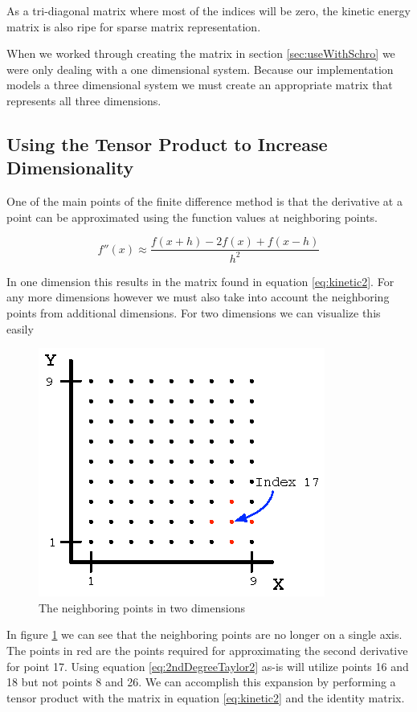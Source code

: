 \documentclass[authoryearcitations]{UoYCSproject}
\begin{document}
As a tri-diagonal matrix where most of the indices will be zero, the kinetic energy matrix is also ripe for sparse
matrix representation. 

When we worked through creating the matrix in section \ref{sec:useWithSchro} we were only dealing with a one dimensional
system. Because our implementation models a three dimensional system we must create an appropriate matrix that represents
all three dimensions. 


\subsection{Using the Tensor Product to Increase Dimensionality}
\label{sec:tensor}
One of the main points of the finite difference method is that the derivative at a point can be approximated
using the function values at neighboring points.

\begin{equation}
f''(x) \approx \frac{f(x + h) - 2f(x) + f(x - h)}{h^2}
\label{eq:2ndDegreeTaylor2}
\end{equation}

In one dimension this results in the matrix found in equation \ref{eq:kinetic2}. For any more dimensions however
we must also take into account the neighboring points from additional dimensions. For two dimensions we can visualize
this easily

\begin{figure}
\centering
  \includegraphics[scale=1.2]{figures/finite2D.eps}
  \caption{The neighboring points in two dimensions}
\label{fig:finite2D}
\end{figure}

In figure \ref{fig:finite2D} we can see that the neighboring points are no longer on a single axis. The points in red
are the points required for approximating the second derivative for point 17. Using equation \ref{eq:2ndDegreeTaylor2} as-is
will utilize points 16 and 18 but not points 8 and 26. We can accomplish this expansion by performing a tensor product
with the matrix in equation \ref{eq:kinetic2} and the identity matrix. 
\end{document}
